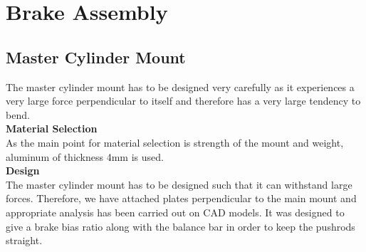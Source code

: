 \chapter{Brake Assembly}

\section{Master Cylinder Mount}
The master cylinder mount has to be designed very carefully as it experiences a very large force perpendicular to itself and therefore has a very large tendency to bend.\\
\textbf{Material Selection}\\
As the main point for material selection is strength of the mount and weight, aluminum of thickness 4mm is used.\\
\textbf{Design}\\
The master cylinder mount has to be designed such that it can withstand large forces. Therefore, we have attached plates perpendicular to the main mount and appropriate analysis has been carried out on CAD models. It was designed to give a brake bias ratio along with the balance bar in order to keep the pushrods straight.

